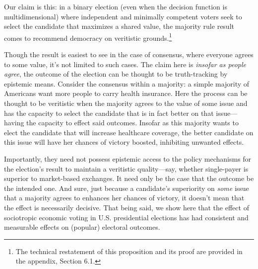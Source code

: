 \documentclass[11pt]{article}
\begin{document}
Our claim is this: in a binary election (even when the decision function is multidimensional) where independent and minimally competent voters seek to select the candidate that maximizes a shared value, the majority rule result comes to recommend democracy on veritistic grounds.\footnote{The technical restatement of this proposition and its proof are provided in the appendix, Section 6.1.}

Though the result is easiest to see in the case of consensus, where everyone agrees to some value, it's not limited to such cases. The claim here is \emph{insofar as people agree}, the outcome of the election can be thought to be truth-tracking by epistemic means.  Consider the consensus within a majority: a simple majority of Americans want more people to carry health insurance.
 Here the process can be thought to be veritistic when the majority agrees to the value of some issue and has the capacity to select the candidate that is in fact better on that issue---having the capacity to effect said outcomes. Insofar as this majority wants to elect the candidate that will increase healthcare coverage, the better candidate on this issue will have her chances of victory boosted, inhibiting unwanted effects. 
 
Importantly, they need not possess epistemic access to the policy mechanisms for the election's result to maintain a veritistic quality---say, whether single-payer is superior to market-based exchanges. It need only be the case that the outcome be the intended one. And sure, just because a candidate's superiority on \emph{some} issue that a majority agrees to enhances her chances of victory, it doesn't mean that the effect is necessarily decisive. That being said, we show here that the effect of sociotropic economic voting in U.S. presidential elections  has had consistent and measurable  effects on (popular) electoral outcomes.
\end{document}
